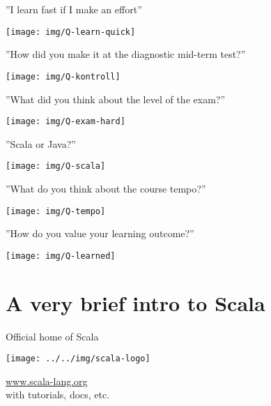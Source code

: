 \documentclass{lecturenotes}
\newcommand{\Section}[1]{\section{#1}\frame{\centering\huge\bfseries\textcolor{blue}{#1}}}
\begin{document}
\begin{Slide}{''I learn fast if I make an effort''}
\begin{center}
\texttt{[image: img/Q-learn-quick]}
\end{center}
\end{Slide}

\begin{Slide}{''How did you make it at the diagnostic mid-term test?''}
\begin{center}
\texttt{[image: img/Q-kontroll]}
\end{center}
\end{Slide}

\begin{Slide}{''What did you think about the level of the exam?''}
\begin{center}
\texttt{[image: img/Q-exam-hard]}
\end{center}
\end{Slide}

\begin{Slide}{''Scala or Java?''}
\begin{center}
\texttt{[image: img/Q-scala]}
\end{center}
\end{Slide}

\begin{Slide}{''What do you think about the course tempo?''}
\begin{center}
\texttt{[image: img/Q-tempo]}
\end{center}
\end{Slide}


\begin{Slide}{''How do you value your learning outcome?''}
\begin{center}
\texttt{[image: img/Q-learned]}
\end{center}
\end{Slide}

\Section{A very brief intro to Scala}

\begin{Slide}{Official home of Scala}
\begin{multicols}{2}
\texttt{[image: ../../img/scala-logo]}

\columnbreak

\hfill\vfill{\large\url{www.scala-lang.org}}\\ with tutorials, docs, etc.

\end{multicols}
\end{Slide}
\end{document}
